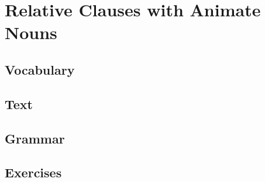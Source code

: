 \chapter{Relative Clauses with Animate Nouns}
\section*{Vocabulary}
\section*{Text}
\section*{Grammar}
\section*{Exercises}
